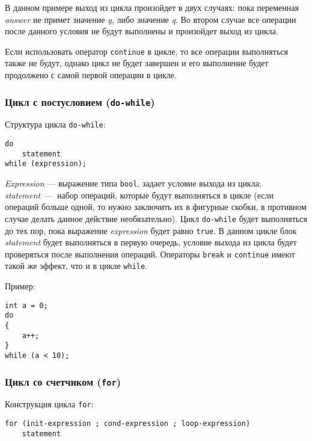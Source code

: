 В данном примере выход из цикла произойдет в двух случаях: пока переменная \textit{answer} не примет значение \textit{y}, либо значение \textit{q}. Во втором случае все операции после данного условия не будут выполнены и произойдет выход из цикла.

Если использовать оператор \lstinline|continue| в цикле, то все операции выполняться также не будут, однако цикл не будет завершен и его выполнение будет продолжено с самой первой операции в цикле.

\subsubsection{Цикл с постусловием (\texttt{do-while})}
Структура цикла \lstinline|do-while|:
\begin{lstlisting}
do
    statement
while (expression);
\end{lstlisting}

\textit{Expression} --- выражение типа \lstinline|bool|, задает условие выхода из цикла; \textit{statement}~---~набор операций, которые будут выполняться в цикле (если операций больше одной, то нужно заключить их в фигурные скобки, в противном случае делать данное действие необязательно). Цикл \lstinline|do-while| будет выполняться до тех пор, пока выражение \textit{expression} будет равно \lstinline|true|. В данном цикле блок \textit{statement} будет выполняться в первую очередь, условие выхода из цикла будет проверяться после выполнения операций. Операторы \lstinline|break| и \lstinline|continue| имеют такой же эффект, что и в цикле \lstinline|while|.

Пример:
\begin{lstlisting}
int a = 0;
do
{
    a++;
}
while (a < 10);
\end{lstlisting}

\subsubsection{Цикл со счетчиком (\texttt{for})}
Конструкция цикла \lstinline|for|:
\begin{lstlisting}
for (init-expression ; cond-expression ; loop-expression)
    statement
\end{lstlisting}


